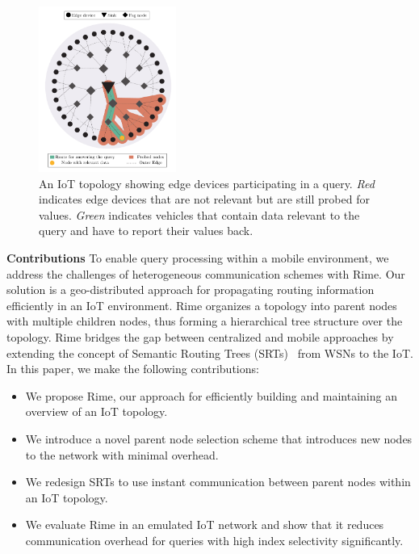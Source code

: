 \begin{figure}[t]
        \centering
        \includegraphics[width=0.4\textwidth]{img/vliot-intro-graphic/tex/intro-fog-topology.pdf}
        \caption{An IoT topology showing edge devices participating in a query. \textit{Red} indicates edge devices that are not relevant but are still probed for values. \textit{Green} indicates vehicles that contain data relevant to the query and have to report their values back.}
        \label{fig:problem}
\end{figure}

\textbf{Contributions}
To enable query processing within a mobile environment, we address the challenges of heterogeneous communication schemes with Rime.
Our solution is a geo-distributed approach for propagating routing information efficiently in an IoT environment. Rime organizes a topology into parent nodes with multiple children nodes, thus forming a hierarchical tree structure over the topology.
Rime bridges the gap between centralized and mobile approaches by extending the concept of Semantic Routing 
Trees (SRTs)~\cite{madden2005tinydb} from WSNs to the IoT. 
%
In this paper, we make the following contributions: 
\begin{itemize}
        \item We propose Rime, our approach for efficiently building and maintaining an overview of an IoT topology.
        \item We introduce a novel parent node selection scheme that introduces new nodes to the network with minimal overhead.
        \item We redesign SRTs to use instant communication between parent nodes within an IoT topology.
        \item We evaluate Rime in an emulated IoT network and show that it reduces communication overhead for queries with high index selectivity significantly.
\end{itemize}

